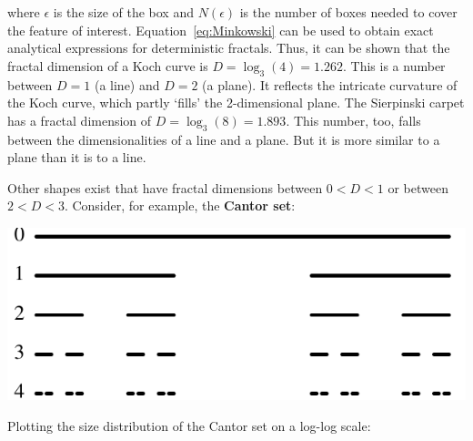 \noindent where $\epsilon$ is the size of the box and $N(\epsilon)$ is
the number of boxes needed to cover the feature of
interest. Equation~\ref{eq:Minkowski} can be used to obtain exact
analytical expressions for deterministic fractals. Thus, it can be
shown that the fractal dimension of a Koch curve is
$D=\log_{3}(4)=1.262$. This is a number between $D=1$ (a line) and
$D=2$ (a plane). It reflects the intricate curvature of the Koch
curve, which partly `fills' the 2-dimensional plane.  The Sierpinski
carpet has a fractal dimension of $D=\log_{3}(8)=1.893$. This number,
too, falls between the dimensionalities of a line and a plane. But it
is more similar to a plane than it is to a line.\medskip

Other shapes exist that have fractal dimensions between $0 < D < 1$ or
between $2 < D < 3$. Consider, for example, the \textbf{Cantor set}:

\noindent\begin{minipage}[t][][b]{.4\textwidth}
  \includegraphics[width=\textwidth]{../figures/cantor.pdf}\medskip
\end{minipage}
\begin{minipage}[t][][t]{.6\textwidth}
  \label{fig:cantor}
\end{minipage}

Plotting the size distribution of the Cantor set on a log-log scale:


